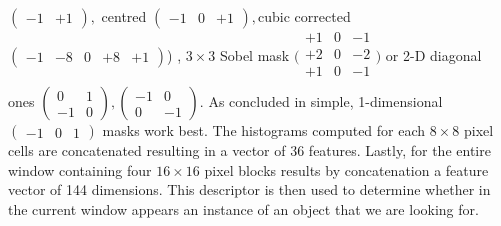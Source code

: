 $
(
\begin{smallmatrix}
	-1 & +1
\end{smallmatrix}), 
$
centred 
$(
\begin{smallmatrix}
-1 & 0 & +1
\end{smallmatrix}),
$cubic corrected
$
 ( 
\begin{smallmatrix}
	-1 & -8 & 0 & +8 & +1
\end{smallmatrix})
$)
, $3\times3$ Sobel mask
$
\bigl(
\begin{smallmatrix}
	+1 & 0 & -1 \\
	+2 & 0 & -2 \\
	+1 & 0 & -1 \\
\end{smallmatrix}
\bigr)
$ or 2-D diagonal ones 
$
(
\begin{smallmatrix}
	 0 & 1\\
    -1 & 0
\end{smallmatrix}
),
(
\begin{smallmatrix}
	-1 & 0\\
	 0 & -1
\end{smallmatrix}
)
$. As concluded in \cite{DalalTriggs05} simple, 1-dimensional $(\begin{smallmatrix}
-1 & 0 & 1
\end{smallmatrix})$ masks work best. The histograms computed for each $8\times8$ pixel cells are concatenated resulting in a vector of 36 features. Lastly, for the entire window containing four $16\times16$ pixel blocks results by concatenation a feature vector of 144 dimensions.
This descriptor is then used to determine whether in the current window appears an instance of an object that we are looking for.
